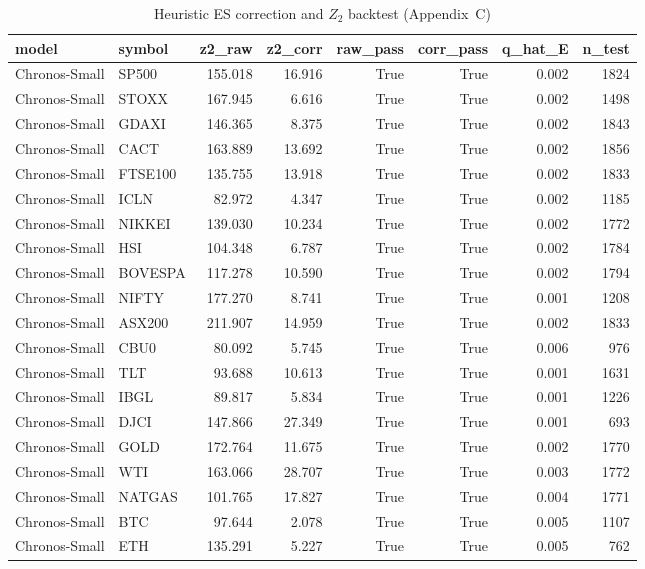 \begin{table}[H]
  \centering
  \caption{Heuristic ES correction and $Z_2$ backtest (Appendix~C)}
  \label{tab:es_correction}
  \footnotesize
\begin{tabular}{llrrrrrr}
\toprule
model & symbol & z2_raw & z2_corr & raw_pass & corr_pass & q_hat_E & n_test \\
\midrule
Chronos-Small & SP500 & 155.018 & 16.916 & True & True & 0.002 & 1824 \\
Chronos-Small & STOXX & 167.945 & 6.616 & True & True & 0.002 & 1498 \\
Chronos-Small & GDAXI & 146.365 & 8.375 & True & True & 0.002 & 1843 \\
Chronos-Small & CACT & 163.889 & 13.692 & True & True & 0.002 & 1856 \\
Chronos-Small & FTSE100 & 135.755 & 13.918 & True & True & 0.002 & 1833 \\
Chronos-Small & ICLN & 82.972 & 4.347 & True & True & 0.002 & 1185 \\
Chronos-Small & NIKKEI & 139.030 & 10.234 & True & True & 0.002 & 1772 \\
Chronos-Small & HSI & 104.348 & 6.787 & True & True & 0.002 & 1784 \\
Chronos-Small & BOVESPA & 117.278 & 10.590 & True & True & 0.002 & 1794 \\
Chronos-Small & NIFTY & 177.270 & 8.741 & True & True & 0.001 & 1208 \\
Chronos-Small & ASX200 & 211.907 & 14.959 & True & True & 0.002 & 1833 \\
Chronos-Small & CBU0 & 80.092 & 5.745 & True & True & 0.006 & 976 \\
Chronos-Small & TLT & 93.688 & 10.613 & True & True & 0.001 & 1631 \\
Chronos-Small & IBGL & 89.817 & 5.834 & True & True & 0.001 & 1226 \\
Chronos-Small & DJCI & 147.866 & 27.349 & True & True & 0.001 & 693 \\
Chronos-Small & GOLD & 172.764 & 11.675 & True & True & 0.002 & 1770 \\
Chronos-Small & WTI & 163.066 & 28.707 & True & True & 0.003 & 1772 \\
Chronos-Small & NATGAS & 101.765 & 17.827 & True & True & 0.004 & 1771 \\
Chronos-Small & BTC & 97.644 & 2.078 & True & True & 0.005 & 1107 \\
Chronos-Small & ETH & 135.291 & 5.227 & True & True & 0.005 & 762 \\

\end{tabular}
\end{table}
